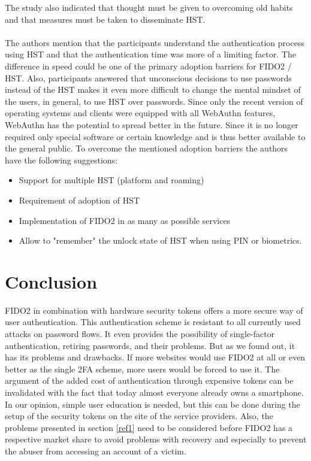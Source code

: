 \documentclass[runningheads]{llncs}
\begin{document}
The study also indicated that thought must be given to overcoming old habits and that measures must be taken to disseminate HST.

\paragraph{}
The authors mention that the participants understand the authentication process using HST and that the authentication time was more of a limiting factor. The difference in speed could be one of the primary adoption barriers for FIDO2 / HST. Also, participants answered that unconscious decisions to use passwords instead of the HST makes it even more difficult to change the mental mindset of the users, in general, to use HST over passwords. Since only the recent version of operating systems and clients were equipped with all WebAuthn features, WebAuthn has the potential to spread better in the future. Since it is no longer required only special software or certain knowledge and is thus better available to the general public. To overcome the mentioned adoption barriers the authors have the following suggestions:
\begin{itemize}
  \item Support for multiple HST (platform and roaming)
  \item Requirement of adoption of HST
  \item Implementation of FIDO2 in as many as possible services
  \item Allow to "remember" the unlock state of HST when using PIN or biometrics.
\end{itemize}
\cite{255646}

\section{Conclusion}
FIDO2 in combination with hardware security tokens offers a more secure way of user authentication. This authentication scheme is resistant to all currently used attacks on password flows. It even provides the possibility of single-factor authentication, retiring passwords, and their problems. But as we found out, it has its problems and drawbacks. If more websites would use FIDO2 at all or even better as the single 2FA scheme, more users would be forced to use it. The argument of the added cost of authentication through expensive tokens can be invalidated with the fact that today almost everyone already owns a smartphone. In our opinion, simple user education is needed, but this can be done during the setup of the security tokens on the site of the service providers. Also, the problems presented in section \ref{ref1} need to be considered before FIDO2 has a respective market share to avoid problems with recovery and especially to prevent the abuser from accessing an account of a victim.




\end{document}
